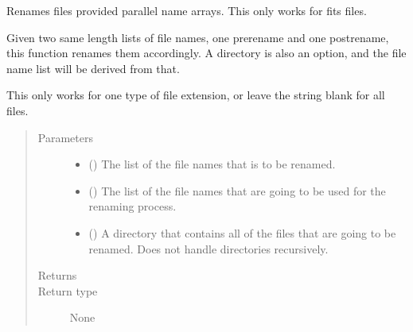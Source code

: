 \documentclass[letterpaper,10pt,english]{sphinxmanual}
\begin{document}
\begin{fulllineitems}
\label{\detokenize{docstrings/ifa_smeargle.core.io:ifa_smeargle.core.io.rename_by_parallel_replace}}
Renames files provided parallel name arrays. This only works
for fits files.

Given two same length lists of file names, one pre\sphinxhyphen{}rename and one
post\sphinxhyphen{}rename, this function renames them accordingly. A directory
is also an option, and the file name list will be derived from
that.

This only works for one type of file extension, or leave the
string blank for all files.
\begin{quote}\begin{description}
\item[{Parameters}] \leavevmode\begin{itemize}
\item {} 
 () \textendash{} The list of the file names that is to be renamed.

\item {} 
 () \textendash{} The list of the file names that are going to be used for the
renaming process.

\item {} 
 (\sphinxstyleliteralemphasis{\sphinxupquote{ (}}\sphinxstyleliteralemphasis{\sphinxupquote{)}}) \textendash{} A directory that contains all of the files that are going
to be renamed. Does not handle directories recursively.

\end{itemize}

\item[{Returns}] \leavevmode


\item[{Return type}] \leavevmode
None

\end{description}\end{quote}

\end{fulllineitems}
\end{document}
